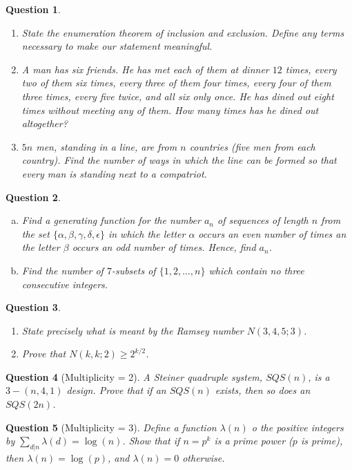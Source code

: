 \documentclass[12]{article}
\newtheorem{question}{Question}
\theoremstyle{definition}
\begin{document}
	\begin{question}
		\
		\begin{enumerate}
			\item State the enumeration theorem of inclusion and exclusion.  Define any terms necessary to make our statement meaningful.
			\item A man has six friends.  He has met each of them at dinner $12$ times, every two of them six times, every three of them four times, every four of them three times, every five twice, and all six only once.  He has dined out eight times without meeting any of them.  How many times has he dined out altogether?
			\item $5n$ men, standing in a line, are from $n$ countries (five men from each country).  Find the number of ways in which the line can be formed so that every man is standing next to a compatriot.
		\end{enumerate}
	\end{question}

	\begin{question}
		\
		\begin{enumerate}[a)]
			\item Find a generating function for the number $a_n$ of sequences of length $n$ from the set $\{\alpha, \beta, \gamma, \delta, \epsilon\}$ in which the letter $\alpha$ occurs an even number of times an the letter $\beta$ occurs an odd number of times.  Hence, find $a_n$.
			\item Find the number of $7$-subsets of $\{1, 2, \ldots, n\}$ which contain no three consecutive integers.
		\end{enumerate}
	\end{question}

	\begin{question}
		\
		\begin{enumerate}
			\item State precisely what is meant by the Ramsey number $N(3,4,5;3)$.
			\item Prove that $N(k,k;2) \geq 2^{k/2}$.
		\end{enumerate}
	\end{question}
	
	\begin{question}[Multiplicity = 2]
		A Steiner quadruple system, $SQS(n)$, is a $3-(n,4,1)$ design.  Prove that if an $SQS(n)$ exists, then so does an $SQS(2n)$.
	\end{question}

	\begin{question}[Multiplicity = 3]
		Define a function $\lambda(n)$ o the positive integers by $\sum_{d|n} \lambda(d) = \log(n)$.  Show that if $n =  p^k$ is a prime power ($p$ is prime), then $\lambda(n) = \log(p)$, and $\lambda(n) = 0$ otherwise.
	\end{question}
\end{document}
